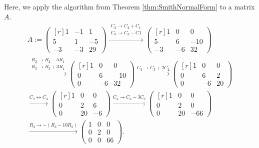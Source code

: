 \documentclass[../algebraNotesMSRI-UP2016.tex]{subfiles}
\begin{document}
\begin{frame}{}{}
\begin{ex}\label{ex:diagonalAlgorithm}
Here, we apply the algorithm from Theorem \ref{thm:SmithNormalForm} to a matrix $A$.
\begin{multline*}
A:=\begin{pmatrix*}[r]
	1 & -1 & 1 \\
	5 & 1 & -5 \\
	-3 & -3 & 29 
	\end{pmatrix*}\xrightarrow{\substack{C_2\to C_2+C_1 \\ C_3\to C_3-C1}}
\begin{pmatrix*}[r]
1 & 0 & 0 \\
5 & 6 & -10 \\
-3 & -6 & 32 
\end{pmatrix*} \\
\xrightarrow{\substack{R_2\to R_2-5R_1 \\ R_3\to R_3+3R_1}}
\begin{pmatrix*}[r]
1 & 0 & 0 \\
0 & 6 & -10 \\
0 & -6 & 32
\end{pmatrix*}\xrightarrow{C_3\to C_3+2C_2}
\begin{pmatrix*}[r]
1 & 0 & 0 \\
0 & 6 & 2 \\
0 & -6 & 20
\end{pmatrix*} 
\\ \xrightarrow{C_2\leftrightarrow C_3}
\begin{pmatrix*}[r]
1 & 0 & 0 \\
0 & 2 & 6 \\
0 & 20 & -6
\end{pmatrix*}\xrightarrow{C_3\to C_3-3C_2}
\begin{pmatrix*}[r]
1 & 0 & 0 \\
0 & 2 & 0 \\
0 & 20 & -66
\end{pmatrix*} \\
\xrightarrow{R_3\to -(R_3-10R_2)}
\begin{pmatrix}
1 & 0 & 0 \\
0 & 2 & 0 \\
0 & 0 & 66
\end{pmatrix}.
\end{multline*}
\end{ex}
\end{frame}
\end{document}
